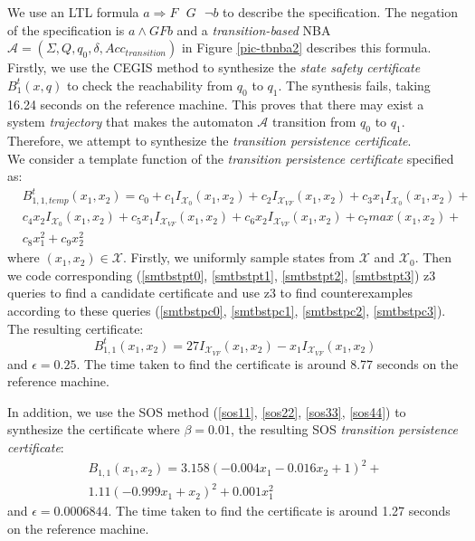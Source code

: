 \documentclass[acmlarge]{acmart}
\begin{document}
We use an LTL formula $a \Longrightarrow F\text{ }G\text{ }\lnot b$ to describe the specification. The negation of the specification is $a \land G F b$ and a \emph{transition-based} NBA $\mathcal{A} = (\Sigma, Q, q_0, \delta, Acc_{transition})$ in Figure \ref{pic-tbnba2} describes this formula. Firstly, we use the CEGIS method to synthesize the \emph{state safety certificate} $B_1^t(x, q)$ to check the reachability from $q_0$ to $q_1$. The synthesis fails, taking 16.24 seconds on the reference machine. This proves that there may exist a system \emph{trajectory} that makes the automaton $\mathcal{A}$ transition from $q_0$ to $q_1$. Therefore, we attempt to synthesize the \emph{transition persistence certificate}.\\
We consider a template function of the \emph{transition persistence certificate} specified as: 
\begin{align*}
  & B_{1, 1, temp}^t(x_1, x_2) = c_0 + c_1 I_{\mathcal{X}_0}(x_1, x_2) + c_2 I_{\mathcal{X}_{VF}}(x_1, x_2) + c_3 x_1 I_{\mathcal{X}_0}(x_1, x_2) + \\
  & c_4 x_2 I_{\mathcal{X}_0}(x_1, x_2) + c_5 x_1 I_{\mathcal{X}_{VF}}(x_1, x_2) + c_6 x_2 I_{\mathcal{X}_{VF}}(x_1, x_2) + c_7 max(x_1, x_2) + \\
  & c_8 x_1^2 + c_9 x_2^2
\end{align*}
where $(x_1, x_2) \in \mathcal{X}$. Firstly, we uniformly sample states from $\mathcal{X}$ and $\mathcal{X}_0$. Then we code corresponding (\ref{smtbstpt0}, \ref{smtbstpt1}, \ref{smtbstpt2}, \ref{smtbstpt3}) z3 queries to find a candidate certificate and use z3 to find counterexamples according to these queries (\ref{smtbstpc0}, \ref{smtbstpc1}, \ref{smtbstpc2}, \ref{smtbstpc3}). The resulting certificate: $$B_{1, 1}^t(x_1, x_2) = 27 I_{\mathcal{X}_{VF}}(x_1, x_2)- x_1 I_{\mathcal{X}_{VF}}(x_1, x_2)$$ and $\epsilon=0.25$. The time taken to find the certificate is around 8.77 seconds on the reference machine.

In addition, we use the SOS method (\ref{sos11}, \ref{sos22}, \ref{sos33}, \ref{sos44}) to synthesize the certificate where $\beta=0.01$, the resulting SOS \emph{transition persistence certificate}:
\begin{align*}
  B_{1, 1}(x_1, x_2) = 3.158 (-0.004 x_1 - 0.016 x_2 + 1)^2 + \\
  1.11 (-0.999 x_1 + x_2)^2 + 0.001 x_1^2  
\end{align*}
and $\epsilon = 0.0006844$. The time taken to find the certificate is around 1.27 seconds on the reference machine.
\end{document}
